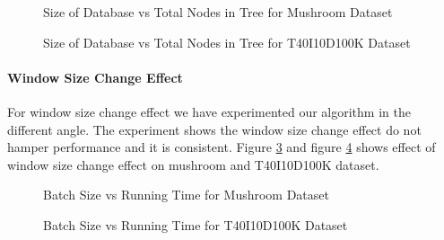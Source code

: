         \begin{figure}[h]
        \centering
            
        \caption{Size of Database vs Total Nodes in Tree for Mushroom Dataset }
        \label{result:g_m_const_tran_mem}
        \end{figure}
        \begin{figure}[h]
        \centering
            
        \caption{Size of Database vs Total Nodes in Tree for T40I10D100K Dataset }
        \label{result:g_t10_const_tran_mem}
        \end{figure}
%            
%        
    \paragraph{Window Size Change Effect}For window size change effect we have experimented our algorithm in the different angle. The experiment shows the window size change effect do not hamper performance and it is consistent. Figure \ref{result:g_m_const_batch} and figure \ref{result:g_t10_const_batch} shows effect of window size change effect on mushroom and T40I10D100K dataset.
        \begin{figure}[h]
        \centering
            
        \caption{Batch Size vs Running Time for Mushroom Dataset }
        \label{result:g_m_const_batch}
        \end{figure}
        \begin{figure}[h]
        \centering
            
        \caption{Batch Size vs Running Time for T40I10D100K Dataset }
        \label{result:g_t10_const_batch}
        \end{figure}
